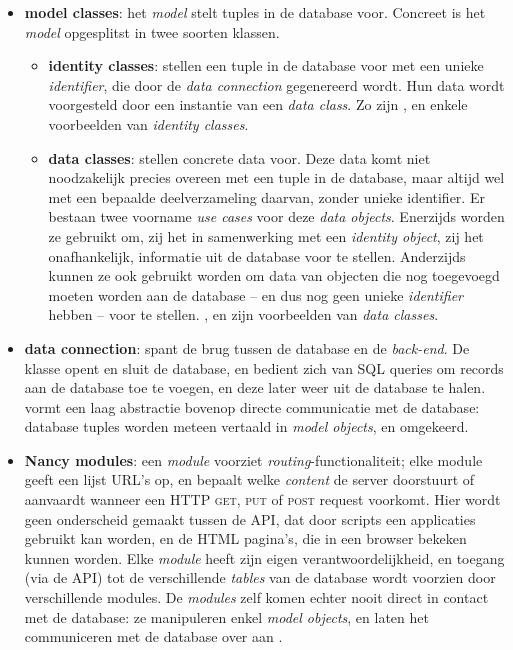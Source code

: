 \documentclass[12pt,a4paper]{article}
\begin{document}
\begin{itemize}

\item \textbf{model classes}: het \emph{model} stelt tuples in de database voor. Concreet is het \emph{model} opgesplitst in twee soorten klassen.

\begin{itemize}

\item \textbf{identity classes}: stellen een tuple in de database voor met een unieke \emph{identifier}, die door de \emph{data connection} gegenereerd wordt. Hun data wordt voorgesteld door een instantie van een \emph{data class}. Zo zijn ,  en  enkele voorbeelden van \emph{identity classes}.

\item \textbf{data classes}: stellen concrete data voor. Deze data komt niet noodzakelijk precies overeen met een tuple in de database, maar altijd wel met een bepaalde deelverzameling daarvan, zonder unieke identifier. Er bestaan twee voorname \emph{use cases} voor deze \emph{data objects}. Enerzijds worden ze gebruikt om, zij het in samenwerking met een \emph{identity object}, zij het onafhankelijk, informatie uit de database voor te stellen. Anderzijds kunnen ze ook gebruikt worden om data van objecten die nog toegevoegd moeten worden aan de database -- en dus nog geen unieke \emph{identifier} hebben -- voor te stellen. ,  en  zijn voorbeelden van \emph{data classes}.

\end{itemize}

\item \textbf{data connection}: spant de brug tussen de database en de \emph{back-end}. De  klasse opent en sluit de database, en bedient zich van SQL queries om records aan de database toe te voegen, en deze later weer uit de database te halen.  vormt een laag abstractie bovenop directe communicatie met de database: database tuples worden meteen vertaald in \emph{model objects}, en omgekeerd.

\item \textbf{Nancy modules}: een \emph{module} voorziet \emph{routing}-functionaliteit; elke module geeft een lijst URL's op, en bepaalt welke \emph{content} de server doorstuurt of aanvaardt wanneer een HTTP \textsc{get}, \textsc{put} of \textsc{post} request voorkomt. Hier wordt geen onderscheid gemaakt tussen de API, dat door scripts een applicaties gebruikt kan worden, en de HTML pagina's, die in een browser bekeken kunnen worden. Elke \emph{module} heeft zijn eigen verantwoordelijkheid, en toegang (via de API) tot de verschillende \emph{tables} van de database wordt voorzien door verschillende modules. De \emph{modules} zelf komen echter nooit direct in contact met de database: ze manipuleren enkel \emph{model objects}, en laten het communiceren met de database over aan .


\end{itemize}
\end{document}
